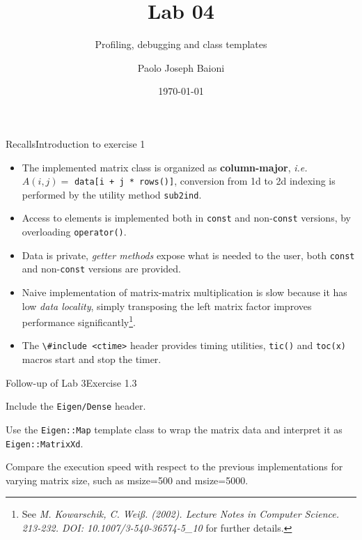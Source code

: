 \documentclass[9pt]{beamer}
\begin{document}
    \title{Lab 04} \subtitle{Profiling, debugging and class templates}
    \author{Paolo Joseph Baioni}
    \date{\today}

\begin{frame}
    \maketitle
\end{frame}

\begin{frame}{Recalls}{Introduction to exercise 1}
\begin{itemize}
\item The implemented matrix class is organized as
      \textbf{column-major}, \textit{i.e.}
      $A(i, j) = $ \lstinline{data[i + j * rows()]}, 
      conversion from 1d to 2d indexing is performed by the utility
      method \lstinline{sub2ind}.\\[3mm]
\item Access to elements is implemented both in \texttt{const} and non-\texttt{const} versions, by overloading \lstinline{operator()}. \\[3mm]
\item Data is private, \textit{getter methods} expose what is needed to the user, both \texttt{const} and non-\texttt{const} versions are provided. \\[3mm]
\item Naive implementation of matrix-matrix multiplication is slow because it has low \textit{data locality}, simply transposing the left matrix factor improves performance significantly\footnote{See \textit{M. Kowarschik, C. Weiß. (2002). Lecture Notes in Computer Science. 213-232. DOI: 10.1007/3-540-36574-5\_10} for further details.}.\\[3mm]
\item The \lstinline{\#include <ctime>} header provides timing utilities, \lstinline{tic()} and \lstinline{toc(x)} macros start and stop the timer.
\end{itemize}
\end{frame}

\begin{frame}{Follow-up of Lab 3}{Exercise 1.3}
\begin{itemize}
{\color{gray}\item Include the {\tt Eigen/Dense} header.
\item Use the {\tt Eigen::Map} template class to wrap the matrix data and interpret it as {\tt Eigen::MatrixXd}.}
\item Compare the execution speed with respect to the previous implementations for varying matrix size, such as 
{\ttfamily msize=500} and {\ttfamily msize=5000}.
\end{itemize}
\end{frame}
\end{document}
